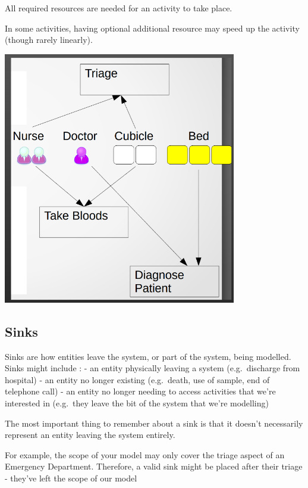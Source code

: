 \documentclass[
  letterpaper,
  DIV=11,
  numbers=noendperiod]{scrreprt}
\begin{document}
All required resources are needed for an activity to take place.

In some activities, having optional additional resource may speed up the
activity (though rarely linearly).

\includegraphics{images/resources_simple.png}

\subsection{Sinks}\label{sinks}

Sinks are how entities leave the system, or part of the system, being
modelled. Sinks might include : - an entity physically leaving a system
(e.g.~discharge from hospital) - an entity no longer existing
(e.g.~death, use of sample, end of telephone call) - an entity no longer
needing to access activities that we're interested in (e.g.~they leave
the bit of the system that we're modelling)

The most important thing to remember about a sink is that it doesn't
necessarily represent an entity leaving the system entirely.

For example, the scope of your model may only cover the triage aspect of
an Emergency Department. Therefore, a valid sink might be placed after
their triage - they've left the scope of our model
\end{document}
